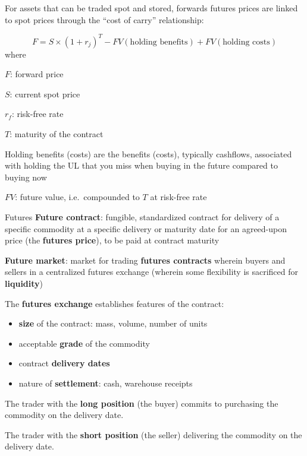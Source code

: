 \documentclass[
  ignorenonframetext,
  aspectratio=169]{beamer}
\providecommand{\tightlist}{%
  \setlength{\itemsep}{0pt}\setlength{\parskip}{0pt}}
\begin{document}
\begin{frame}
For assets that can be traded spot and stored, forwards futures prices
are linked to spot prices through the ``cost of carry'' relationship:

\[
F = S \times (1+r_j)^T - FV(\text{holding benefits}) + FV(\text{holding costs})
\] where

\(F\): forward price

\(S\): current spot price

\(r_f\): risk-free rate

\(T\): maturity of the contract

Holding benefits (costs) are the benefits (costs), typically cashflows,
associated with holding the UL that you miss when buying in the future
compared to buying now

\(FV\): future value, i.e.~compounded to \(T\) at risk-free rate
\end{frame}

\begin{frame}{Futures}
\protect\hypertarget{futures}{}
\textbf{Future contract}: fungible, standardized contract for delivery
of a specific commodity at a specific delivery or maturity date for an
agreed-upon price (the \textbf{futures price}), to be paid at contract
maturity

\textbf{Future market}: market for trading \textbf{futures contracts}
wherein buyers and sellers in a centralized futures exchange (wherein
some flexibility is sacrificed for \textbf{liquidity})
\end{frame}

\begin{frame}
The \textbf{futures exchange} establishes features of the contract:

\begin{itemize}
\tightlist
\item
  \textbf{size} of the contract: mass, volume, number of units
\item
  acceptable \textbf{grade} of the commodity
\item
  contract \textbf{delivery dates}
\item
  nature of \textbf{settlement}: cash, warehouse receipts
\end{itemize}

The trader with the \textbf{long position} (the buyer) commits to
purchasing the commodity on the delivery date.

The trader with the \textbf{short position} (the seller) delivering the
commodity on the delivery date.
\end{frame}
\end{document}
